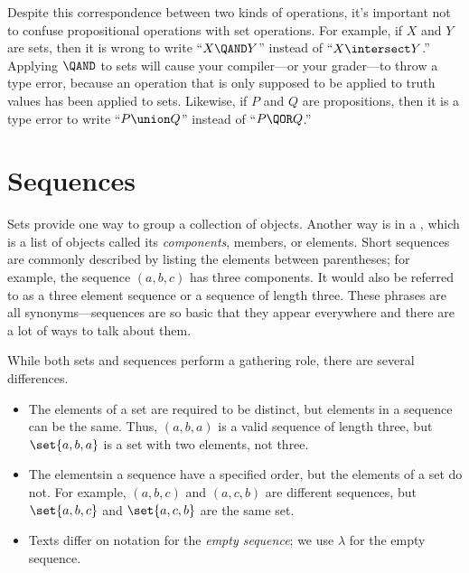Despite this correspondence between two kinds of operations, it's
important not to confuse propositional operations with set operations.
For example, if $X$ and $Y$ are sets, then it is wrong to write ``$X
\QAND Y$'' instead of ``$X \intersect Y$.''  Applying $\QAND$ to sets
will cause your compiler---or your grader---to throw a type error,
because an operation that is only supposed to be applied to truth
values has been applied to sets.  Likewise, if $P$ and $Q$ are
propositions, then it is a type error to write ``$P \union Q$''
instead of ``$P \QOR Q$.''

\begin{problems}

\practiceproblems
{}

\classproblems
{}

\homeworkproblems
{}

\examproblems
{}

\end{problems}

\section{Sequences}\label{seq_sec}

Sets provide one way to group a collection of objects.  Another way is
in a , which is a list of objects called its
\emph{components}, members, or elements.  Short sequences are commonly
described by listing the elements between parentheses; for example,
the sequence $(a, b, c)$ has three components.  It would also be
referred to as a three element sequence or a sequence of length three.
These phrases are all synonyms---sequences are so basic that they
appear everywhere and there are a lot of ways to talk about them.

While both sets and sequences perform a gathering role, there are
several differences.
\begin{itemize}

\item The elements of a set are required to be distinct, but elements in a
sequence can be the same.  Thus, $(a, b, a)$ is a valid sequence of length
three, but $\set{a, b, a}$ is a set with two elements, not three.

\item The elementsin a sequence have a specified order, but the
  elements of a set do not.  For example, $(a, b, c)$ and $(a, c, b)$
  are different sequences, but $\set{a, b, c}$ and $\set{a, c, b}$ are
  the same set.

\item Texts differ on notation for the \emph{empty sequence};%
we use $\lambda$ for the empty sequence.
\end{itemize}

